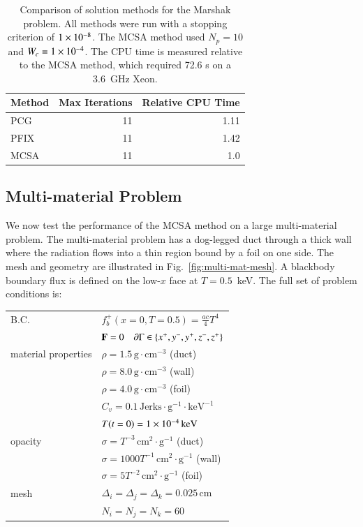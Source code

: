 \documentclass[preprint,12pt]{elsarticle}
\newcommand{\Cv}{\ensuremath{C_{v}}}
\newcommand{\Di}{\ensuremath{\Delta_i}}
\newcommand{\Dj}{\ensuremath{\Delta_j}}
\newcommand{\Dk}{\ensuremath{\Delta_k}}
\begin{document}
\begin{table}[htpb!]
  \begin{center}
    \begin{tabular}{lrr}\hline\hline
      \multicolumn{1}{c}{Method} & 
      \multicolumn{1}{c}{Max Iterations} & 
      \multicolumn{1}{c}{Relative CPU Time}\\\hline\hline
      PCG & 11 & 1.11 \\
      PFIX & 11 & 1.42 \\
      MCSA & 11 & 1.0 \\
      \hline\hline
    \end{tabular}
  \end{center}
  \caption{Comparison of solution methods for the Marshak problem. All
    methods were run with a stopping criterion of $1\times 10^{-8}$.  The
    MCSA method used $N_p=10$ and $W_c = 1\times 10^{-4}$.  The CPU time is
    measured relative to the MCSA method, which required 72.6 s on a
    3.6~GHz Xeon.}
  \label{tab:marshak_comparison}
\end{table}

\subsection{Multi-material Problem}

We now test the performance of the MCSA method on a large
multi-material problem.  The multi-material problem has a dog-legged
duct through a thick wall where the radiation flows into a thin region
bound by a foil on one side.  The mesh and geometry are illustrated in
Fig.~\ref{fig:multi-mat-mesh}.  A blackbody boundary flux is defined
on the low-$x$ face at $T=0.5$~keV.  The full set of problem
conditions is:

\begin{center}
  \begin{tabular}{ll}\hline
    B.C. & $f_b^{+}(x=0,T=0.5) = \frac{ac}{4}T^4$\\
    & $\mathbf{F} = 0\quad \partial\Gamma \in \{x^{+}, y^{-}, y^{+},
    z^{-}, z^{+}\}$ \\
    material properties 
    & $\rho = 1.5\,\text{g}\cdot\text{cm}^{-3}$ (duct) \\
    & $\rho = 8.0\,\text{g}\cdot\text{cm}^{-3}$ (wall) \\
    & $\rho = 4.0\,\text{g}\cdot\text{cm}^{-3}$ (foil) \\
    & $\Cv = 0.1\,\text{Jerks}\cdot\text{g}^{-1}\cdot\text{keV}^{-1}$\\
    & $T(t=0) = 1\times 10^{-4}\,\text{keV}$\\
    opacity 
    & $\sigma = T^{-3}\,\text{cm}^2\cdot\text{g}^{-1}$ (duct) \\
    & $\sigma = 1000T^{-1}\,\text{cm}^2\cdot\text{g}^{-1}$ (wall) \\
    & $\sigma = 5T^{-2}\,\text{cm}^2\cdot\text{g}^{-1}$ (foil) \\
    mesh & $\Di = \Dj = \Dk = 0.025\,\text{cm}$ \\
    & $N_i =  N_j = N_k = 60$ \\
    \hline
  \end{tabular}
\end{center}
\end{document}
